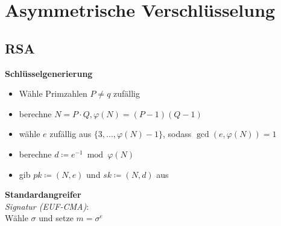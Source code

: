 \section{Asymmetrische Verschlüsselung}%
\label{av:sec:asymmetrische-verschluesselung}

\subsection{RSA}%
\label{av:sub:rsa}
\textbf{Schlüsselgenerierung}
\begin{itemize}
  \item Wähle Primzahlen \(P \neq q\) zufällig
  \item berechne \(N = P \cdot Q, \varphi(N) = (P-1)(Q-1)\)
  \item wähle \(e\) zufällig aus \(\{3,...,\varphi(N)-1\}\), sodass \(\gcd(e, \varphi(N)) = 1\)
  \item berechne \(d \coloneqq e^{-1} \bmod \varphi(N)\)
  \item gib \(\mathit{pk} \coloneqq (N, e)\) und \(\mathit{sk} \coloneqq (N, d)\) aus
\end{itemize}
\textbf{Standardangreifer}\\
\textit{Signatur (EUF-CMA)}:\\
Wähle \(\sigma\) und setze \(m = \sigma^e\)

